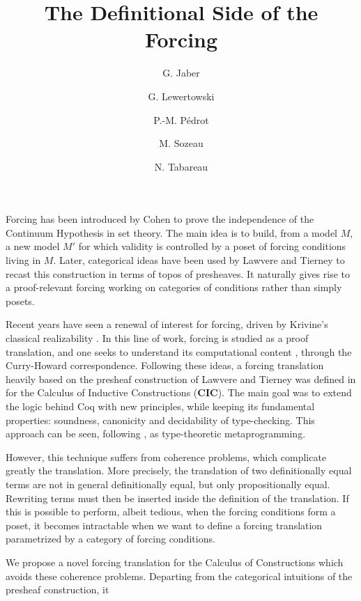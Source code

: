\documentclass{easychair}
\author{G. Jaber\inst{1} \and G. Lewertowski\inst{1} \and P.-M. P\'edrot\inst{2} \and M. Sozeau\inst{1} \and N. Tabareau\inst{2}}
\title{The Definitional Side of the Forcing}
\institute {
IRIF - Universit\'e Paris Diderot / $\pi r^2$ - Inria
\and
Inria Rennes - Bretagne Atlantique
}
\newcommand{\cic}{\mathbf{CIC}}
\begin{document}
\maketitle

  Forcing has been introduced by Cohen to prove the independence of the 
  Continuum Hypothesis in set theory.
  The main idea is to build, from a model $M$, a new model $M'$ for which validity is controlled by a poset of forcing conditions living in $M$.  
  Later, categorical ideas have been used by Lawvere and Tierney \cite{Tierney72} to recast this construction in terms of topos of presheaves. 
  It naturally gives rise to a proof-relevant forcing working on categories of conditions rather than simply posets.
  \par
  Recent years have seen a renewal of interest
  for forcing, driven by Krivine's classical realizability \cite{Krivine09}. In this line of work, forcing is studied as a
  proof translation, and one seeks to understand its computational content \cite{Miquel11,Brunel14}, through the Curry-Howard correspondence.
  Following these ideas, a forcing translation heavily based on the presheaf construction of Lawvere and Tierney was defined in \cite{Jaber12} for the Calculus of Inductive Constructions ($\cic$). The main goal was to extend the logic behind Coq with new principles, while keeping its fundamental properties: soundness, canonicity and decidability of type-checking.
  This approach can be seen, following \cite{Altenkirch16}, as type-theoretic metaprogramming.
  \par
  However, this technique suffers from coherence problems, which complicate greatly the translation. More precisely, the translation of two definitionally equal terms are not 
  in general definitionally equal, but only propositionally equal. Rewriting terms must then be inserted inside the definition of the translation.
  If this is possible to perform, albeit tedious, when the forcing conditions form a poset, it becomes intractable when we want to define a forcing translation parametrized by
  a category of forcing conditions. 
  \par
  We propose a novel forcing translation for the Calculus of Constructions which avoids these coherence problems. Departing from the categorical intuitions of the presheaf construction, it
\end{document}
